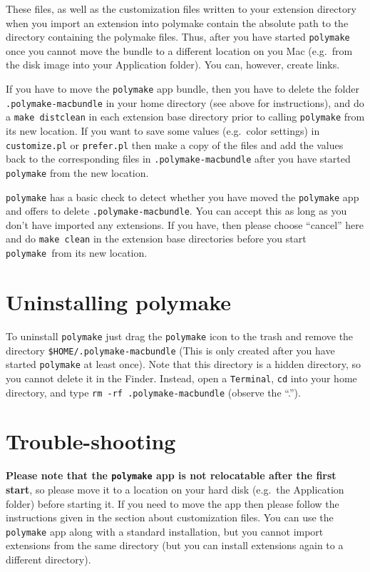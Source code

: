 \documentclass[a4paper]{amsart}
\newcommand{\polymake}{\texttt{polymake}\xspace}
\begin{document}
These files, as well as the customization files written to your
extension directory when you import an extension into polymake contain
the absolute path to the directory containing the polymake
files. Thus, after you have started \polymake once you cannot move
the bundle to a different location on you Mac (e.g.\ from the disk
image into your Application folder). You can, however, create links.

If you have to move the \polymake app bundle, then you have to delete
the folder \texttt{.polymake-macbundle} in your home directory (see
above for instructions), and do a \texttt{make distclean} in each
extension base directory prior to calling \polymake from its new
location. If you want to save some values (e.g.\ color settings) in
\texttt{customize.pl} or \texttt{prefer.pl} then make a copy of the
files and add the values back to the corresponding files in
\texttt{.polymake-macbundle} after you have started \polymake from
the new location.

\polymake has a basic check to detect whether you have moved the
\polymake app and offers to delete \texttt{.polymake-macbundle}. You
can accept this as long as you don't have imported any extensions. If
you have, then please choose ``cancel'' here and do \texttt{make
  clean} in the extension base directories before you start \polymake\
from its new location.

\section*{Uninstalling polymake}

To uninstall \polymake just drag the \polymake icon to the trash and
remove the directory \texttt{\${HOME}/.polymake-macbundle} (This is
only created after you have started \polymake at least once). Note
that this directory is a hidden directory, so you cannot delete it
in the Finder. Instead, open a \texttt{Terminal}, \texttt{cd} into
your home directory, and type \texttt{rm -rf .polymake-macbundle}
(observe the ``.'').

\section*{Trouble-shooting}

\textbf{Please note that the \polymake app is not relocatable after
  the first start}, so please move it to a location on your hard disk
(e.g.\ the Application folder) before starting it. If you need to move
the app then please follow the instructions given in the section about
customization files. You can use the \polymake app along with a
standard installation, but you cannot import extensions from the same
directory (but you can install extensions again to a different
directory).
\end{document}
